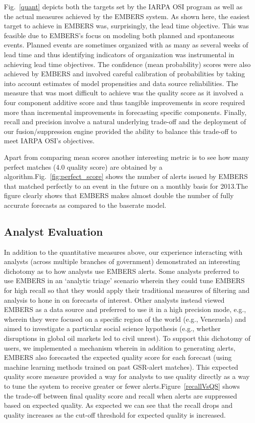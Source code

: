 Fig.~\ref{quant} depicts both the targets set by the IARPA OSI program as well as the
actual measures achieved by the EMBERS system. As shown here, the easiest target to achieve
in EMBERS was, surprisingly, the lead time objective. This was feasible due to EMBERS's focus on modeling
both planned and spontaneous events. Planned events are sometimes organized with as many as several weeks
of lead time and thus identifying indicators of organization was instrumental in achieving
lead time objectives. The confidence (mean probability) scores were also achieved by EMBERS and involved
careful calibration of probabilities by taking into account estimates of
model propensities and data source reliabilities. The measure that was most difficult to achieve
was the quality score as it involved a four component additive score and thus tangible improvements in
score required more than incremental improvements in forecasting specific components. Finally, recall
and precision involve a natural underlying trade-off and the deployment of our fusion/suppression
engine provided the ability to balance this trade-off to meet IARPA OSI's objectives.

Apart from comparing mean scores another interesting metric is to see
how many perfect matches (4.0 quality score) are obtained by a
algorithm.Fig.~\ref{fig:perfect_score} shows the number of alerts issued
by EMBERS that matched perfectly to an event in the future on a monthly
basis for 2013.The figure clearly shows that EMBERS makes almost double
the number of fully accurate forecasts as compared to the baserate
model.


\subsection{Analyst Evaluation}
In addition to the quantitative measures above, our experience interacting with analysts (across multiple
branches of government) demonstrated
an interesting dichotomy as to how analysts use EMBERS alerts. Some analysts preferred to use EMBERS in an
`analytic triage' scenario wherein they could tune EMBERS for high recall so that they would apply their
traditional measures of filtering and analysis to hone in on forecasts of interest. Other analysts
instead viewed EMBERS as a data source and preferred to use it in a high precision mode, e.g., wherein they
were focused on a specific region of the world (e.g., Venezuela) and aimed to investigate a particular
social science hypothesis (e.g., whether disruptions in global oil markets led to civil unrest).
To support this dichotomy of users, we implemented a mechanism wherein in addition to generating alerts, EMBERS
also forecasted the expected quality score for each forecast (using machine learning methods trained on
past GSR-alert matches). This expected quality score measure provided a way for analysts to use quality
directly as a way to tune the system to receive greater or fewer
alerts.Figure~\ref{recallVsQS} shows the trade-off between final quality
score and recall when alerts are suppressed based on expected quality.
As expected we can see that the recall drops and quality increases as the cut-off
threshold for expected quality is increased.

